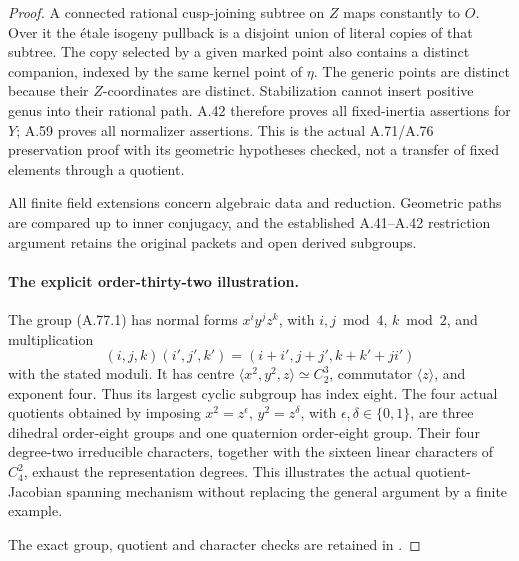 \begin{proof}
A connected rational cusp-joining subtree on \(Z\)
maps constantly to \(O\). Over it the \'{e}tale
isogeny pullback is a disjoint union of literal copies
of that subtree. The copy selected by a given marked
point also contains a distinct companion, indexed by
the same kernel point of \(\eta\). The generic
points are distinct because their \(Z\)-coordinates
are distinct. Stabilization cannot insert positive
genus into their rational path. A.42 therefore proves
all fixed-inertia assertions for \(Y\); A.59 proves
all normalizer assertions. This is the actual A.71/A.76
preservation proof with its geometric hypotheses checked,
not a transfer of fixed elements through a quotient.

All finite field extensions concern algebraic data and
reduction. Geometric paths are compared up to inner
conjugacy, and the established A.41--A.42 restriction
argument retains the original packets and open derived
subgroups.

\paragraph{The explicit order-thirty-two illustration.}
The group (A.77.1) has normal forms
\(x^i y^j z^k\), with \(i,j\bmod4\), \(k\bmod2\),
and multiplication
\[
 (i,j,k)(i',j',k')=(i+i',j+j',k+k'+ji')
                                                        \tag{A.77.10}
\]
with the stated moduli. It has centre
\(\langle x^2,y^2,z\rangle\simeq C_2^3\), commutator
\(\langle z\rangle\), and exponent four. Thus its
largest cyclic subgroup has index eight. The four
actual quotients obtained by imposing
\(x^2=z^\epsilon\), \(y^2=z^\delta\), with
\(\epsilon,\delta\in\{0,1\}\), are three dihedral
order-eight groups and one quaternion order-eight group.
Their four degree-two irreducible characters, together
with the sixteen linear characters of \(C_4^2\),
exhaust the representation degrees. This illustrates
the actual quotient-Jacobian spanning mechanism without
replacing the general argument by a finite example.

The exact group, quotient and character checks are
retained in .
\end{proof}

